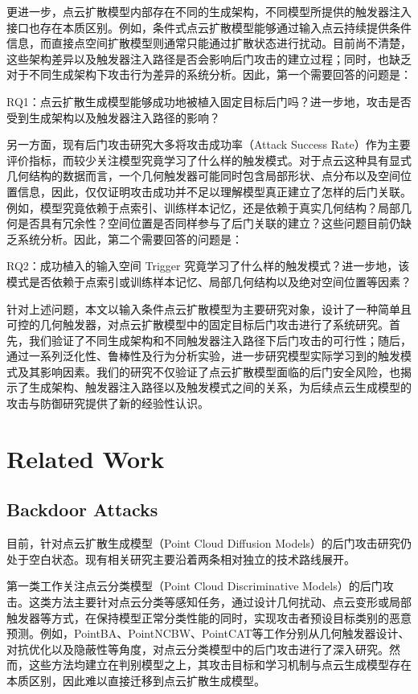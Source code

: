 \documentclass[UTF8,a4paper,11pt]{ctexart}
\begin{document}
更进一步，点云扩散模型内部存在不同的生成架构，不同模型所提供的触发器注入接口也存在本质区别。例如，条件式点云扩散模型能够通过输入点云持续提供条件信息，而直接点空间扩散模型则通常只能通过扩散状态进行扰动。目前尚不清楚，这些架构差异以及触发器注入路径是否会影响后门攻击的建立过程；同时，也缺乏对于不同生成架构下攻击行为差异的系统分析。因此，第一个需要回答的问题是：

RQ1：点云扩散生成模型能够成功地被植入固定目标后门吗？进一步地，攻击是否受到生成架构以及触发器注入路径的影响？

另一方面，现有后门攻击研究大多将攻击成功率（Attack Success Rate）作为主要评价指标，而较少关注模型究竟学习了什么样的触发模式。对于点云这种具有显式几何结构的数据而言，一个几何触发器可能同时包含局部形状、点分布以及空间位置信息，因此，仅仅证明攻击成功并不足以理解模型真正建立了怎样的后门关联。例如，模型究竟依赖于点索引、训练样本记忆，还是依赖于真实几何结构？局部几何是否具有冗余性？空间位置是否同样参与了后门关联的建立？这些问题目前仍缺乏系统分析。因此，第二个需要回答的问题是：

RQ2：成功植入的输入空间 Trigger 究竟学习了什么样的触发模式？进一步地，该模式是否依赖于点索引或训练样本记忆、局部几何结构以及绝对空间位置等因素？

针对上述问题，本文以输入条件点云扩散模型为主要研究对象，设计了一种简单且可控的几何触发器，对点云扩散模型中的固定目标后门攻击进行了系统研究。首先，我们验证了不同生成架构和不同触发器注入路径下后门攻击的可行性；随后，通过一系列泛化性、鲁棒性及行为分析实验，进一步研究模型实际学习到的触发模式及其影响因素。我们的研究不仅验证了点云扩散模型面临的后门安全风险，也揭示了生成架构、触发器注入路径以及触发模式之间的关系，为后续点云生成模型的攻击与防御研究提供了新的经验性认识。


\section{Related Work}

\subsection{Backdoor Attacks}
目前，针对点云扩散生成模型（Point Cloud Diffusion Models）的后门攻击研究仍处于空白状态。现有相关研究主要沿着两条相对独立的技术路线展开。

第一类工作关注点云分类模型（Point Cloud Discriminative Models）的后门攻击。这类方法主要针对点云分类等感知任务，通过设计几何扰动、点云变形或局部触发器等方式，在保持模型正常分类性能的同时，实现攻击者预设目标类别的恶意预测。例如，PointBA、PointNCBW、PointCAT等工作分别从几何触发器设计、对抗优化以及隐蔽性等角度，对点云分类模型中的后门攻击进行了深入研究。然而，这些方法均建立在判别模型之上，其攻击目标和学习机制与点云生成模型存在本质区别，因此难以直接迁移到点云扩散生成模型。
\end{document}
